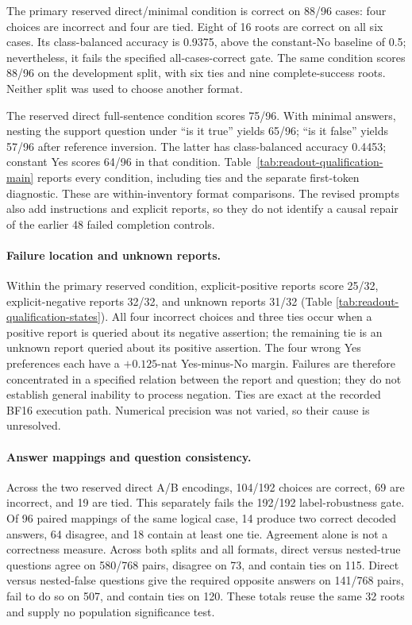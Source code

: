 The primary reserved direct/minimal condition is correct on 88/96 cases:
four choices are incorrect and four are tied. Eight of 16 roots are correct
on all six cases. Its class-balanced accuracy is 0.9375, above the constant-No
baseline of 0.5; nevertheless, it fails the specified all-cases-correct gate.
The same condition scores 88/96 on the development split, with six ties and
nine complete-success roots. Neither split was used to choose another format.

The reserved direct full-sentence condition scores 75/96. With minimal
answers, nesting the support question under ``is it true'' yields 65/96;
``is it false'' yields 57/96 after reference inversion. The latter has
class-balanced accuracy 0.4453; constant Yes scores 64/96 in that condition.
Table~\ref{tab:readout-qualification-main} reports every condition, including
ties and the separate first-token diagnostic. These are within-inventory
format comparisons. The revised prompts also add instructions and explicit
reports, so they do not identify a causal repair of the earlier 48 failed
completion controls.

\paragraph{Failure location and unknown reports.}
Within the primary reserved condition, explicit-positive reports score 25/32,
explicit-negative reports 32/32, and unknown reports 31/32 (Table
\ref{tab:readout-qualification-states}). All four incorrect choices and three
ties occur when a positive report is queried about its negative assertion;
the remaining tie is an unknown report queried about its positive assertion.
The four wrong Yes preferences each have a $+0.125$-nat Yes-minus-No margin.
Failures are therefore concentrated in a specified relation between the
report and question; they do not establish general inability to process
negation. Ties are exact at the recorded BF16 execution path. Numerical
precision was not varied, so their cause is unresolved.

\paragraph{Answer mappings and question consistency.}
Across the two reserved direct A/B encodings, 104/192 choices are correct,
69 are incorrect, and 19 are tied. This separately fails the 192/192
label-robustness gate. Of 96 paired mappings of the same logical case, 14
produce two correct decoded answers, 64 disagree, and 18 contain at least
one tie. Agreement alone is not a correctness measure. Across both splits
and all formats, direct versus nested-true questions agree on 580/768 pairs,
disagree on 73, and contain ties on 115. Direct versus nested-false questions
give the required opposite answers on 141/768 pairs, fail to do so on 507,
and contain ties on 120. These totals reuse the same 32 roots and supply
no population significance test.

